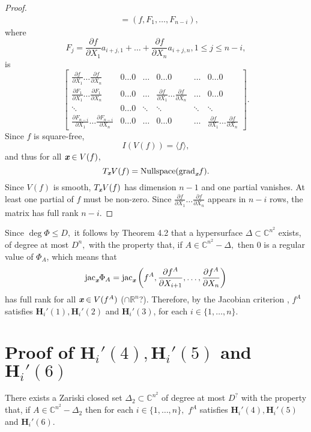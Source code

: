 \documentclass[sigconf]{acmart}
\def\xb{\textit{\textbf{x}}}
\def\C{\mathbb{C}}
\def\R{\mathbb{R}}
\def\jac{ \textrm{jac}}
\def\grad{\textrm{grad}}
\def\pa{\partial}
\begin{document}
\begin{proof}
\begin{align*}
&= (f,F_{1},\hdots,F_{n-i}),  
\end{align*} 
%
where 
\[
F_j = \frac{\pa f}{\pa X_1} a_{i+j,1} + \hdots + \frac{\pa f}{\pa X_n}a_{i+j,n}, 1 \leq j \leq n-i,\]
is
\[
\left[ 
\begin{array}{cccccc}
\frac{\pa f}{\pa X_1} \hdots \frac{\pa f}{\pa X_n}            &0\hdots 0&\hdots& 0 \hdots 0                                         & \hdots & 0\hdots 0 \\ 
\frac{\pa F_{1}}{\pa X_1}\hdots \frac{\pa F_{1}}{\pa X_n}     &0\hdots 0&\hdots& \frac{\pa f}{\pa X_1} \hdots \frac{\pa f}{\pa X_n} & \hdots & 0\hdots 0 \\
\ddots                                                        &0\hdots 0&\ddots&\ddots                                              & \ddots & \ddots \\
\frac{\pa F_{n-i}}{\pa X_1}\hdots \frac{\pa F_{n-i}}{\pa X_n} &0\hdots 0&\hdots&0 \hdots 0&  \hdots & \frac{\pa f}{\pa X_1} \hdots \frac{\pa f}{\pa X_n}  
\end{array}
\right]. 
\] 
Since $f$ is square-free, \[I(V(f)) = \langle f \rangle,\]  and thus for all $\xb \in V(f)$, 
\[
T_{\xb} V(f) = \textrm{Nullspace}(\grad_{\xb} f).
\]
Since $V(f)$ is smooth, $T_{\xb} V(f)$ has dimension $n-1$ and one partial vanishes. At least one partial of $f$ must be non-zero. Since  $\frac{\pa f}{\pa X_1} \hdots \frac{\pa f}{\pa X_n}$ appears in $n-i$ rows, the matrix has full rank $n-i$.
\end{proof}
%
Since $\deg \Phi \leq D,$ it follows by Theorem 4.2 that a hypersurface $\Delta \subset \C^{n^2}$ exists, of degree at most $D^n,$ with the property that, if $A \in \C^{n^2}-\Delta,$ then $0$ is a regular value of $\Phi_{A}$, which means that 
\[
\jac_\textit{\textbf{x}} \Phi_A 
= \jac_\xb \left(f^A,\frac{\pa f^A}{\pa X_{i+1}},\hdots,\frac{\pa f^A}{\pa X_n}\right)
\] 
has full rank for all $\xb \in V(f^A)$ ($\cap \R^n$?). Therefore, by the Jacobian criterion \cite[Theorem 16.19]{ECA}, $f^A$ satisfies $\textbf{H}_i'(1),\textbf{H}_i'(2)$ and $\textbf{H}_i'(3)$, for each $i \in \{1,\hdots,n\}.$
%
%
%
%
\section{Proof of $\textbf{H}_i'(4),\textbf{H}_i'(5)$ and $\textbf{H}_i'(6)$}
%
\begin{theorem}
There exists a Zariski closed set $\Delta_2 \subset \C^{n^2}$ of degree at most $D^{\textrm{?}}$ with the property that, if $A \in \C^{n^2} - \Delta_2$ then for each $i \in \{1,\hdots,n\},$ $f^A$ satisfies $\textbf{H}_i'(4),\textbf{H}_i'(5)$ and $\textbf{H}_i'(6)$.
\end{theorem}
%
\end{document}
